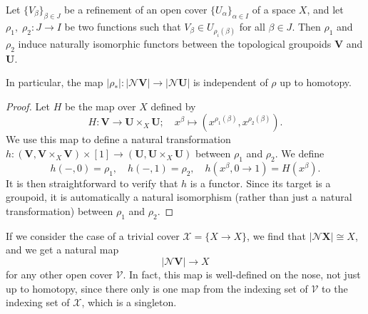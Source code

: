\documentclass[a4paper,openany]{scrbook}
\newcommand{\nerve}{\mathcal N}
\begin{document}
\begin{prop} \label{prop:refinementhomotopyinvariant}
Let $\{V_\beta\}_{\beta \in J}$ be a refinement of an open cover $\{U_\alpha\}_{\alpha \in I}$ of a space $X$, and let $\rho_1,\;\rho_2\colon J \to I$ be two functions such that $V_\beta \in U_{\rho_i(\beta)}$ for all $\beta \in J$. Then $\rho_1$ and $\rho_2$ induce naturally isomorphic functors between the topological groupoids $\mathbf V$ and $\mathbf U$.

In particular, the map $|\rho_*|\colon |\nerve\mathbf V| \to |\nerve \mathbf U|$ is independent of $\rho$ up to homotopy.
\end{prop}
\begin{proof}
Let $H$ be the map over $X$ defined by
\[
H\colon \mathbf V \to \mathbf U \times_X \mathbf U; \quad x^\beta \mapsto (x^{\rho_1(\beta)},x^{\rho_2(\beta)}).
\]
We use this map to define a natural transformation $h\colon (\mathbf V,\mathbf V \times_X \mathbf V) \times [1] \to (\mathbf U,\mathbf U \times_X \mathbf U)$ between $\rho_1$ and $\rho_2$. We define
\[
h(-,0) = \rho_1, \quad h(-,1) = \rho_2, \quad h(x^\beta,0 \to 1) = H(x^\beta).
\]
It is then straightforward to verify that $h$ is a functor. Since its target is a groupoid, it is automatically a natural isomorphism (rather than just a natural transformation) between $\rho_1$ and $\rho_2$.
\end{proof}

If we consider the case of a trivial cover $\mathcal X = \{X \to X\}$, we find that $|\nerve \mathbf X| \cong X$, and we get a natural map
\[
|\nerve\mathbf V| \to X
\]
for any other open cover $\mathcal V$. In fact, this map is well-defined on the nose, not just up to homotopy, since there only is one map from the indexing set of $\mathcal V$ to the indexing set of $\mathcal X$, which is a singleton.
\end{document}
